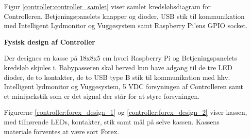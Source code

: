 Figur \ref{controller:controller_samlet} viser samlet kredsløbsdiagram for Controlleren. Betjeningspanelets knapper og dioder, USB stik til kommunikation med Intelligent Lydmonitor og Vuggesystem samt Raspberry Pi'ens GPIO socket.


\textbf{Fysisk design af Controller} \label{forex_controller}

Der designes en kasse på 18x8x5 cm hvori Raspberry Pi og Betjeningspanelets kredsløb skjules i. Babypasseren skal herved kun have adgang til de tre LED dioder, de to kontakter, de to USB type B stik til kommunikation med hhv. Intelligent lydmonitor og Vuggesystem, 5 VDC forsyningen af Controlleren samt et minijackstik som er det signal der står for at styre forsyningen. 

Figurerne \ref{controller:forex_design_1} og \ref{controller:forex_design_2} viser kassen, med tilhørende LEDs, kontakter, stik samt mål på selve kassen. Kassens materiale forventes at være sort Forex.  



